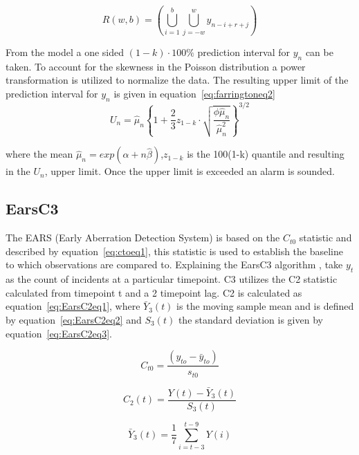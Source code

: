 \begin{equation} 
R(w,b)=(\bigcup_{i=1}^{b}\bigcup_{j=-w}^{w} y_{n-i+r+j})
\label{eq:farringtoneq1}  \end{equation} 

From the model a one sided $(1-k)\cdot 100\%$ prediction interval for $y_{n}$ can be taken. To account for the skewness in the Poisson distribution a power transformation is utilized to normalize the data. The resulting upper limit of the prediction interval for $y_{n}$ is given in equation~\ref{eq:farringtoneq2}
\begin{equation} 
U_{n}=\hat{\mu}_{n}\!\left \{ 1+\frac{2}{3}z_{1-k}\cdot\sqrt{ \frac{{\phi}\hat{\mu}_{n}}{\hat{\mu}^{2}_n}}  \right\}^{3/2}
\label{eq:farringtoneq2}  \end{equation}

where the mean $\hat{\mu}_{n}=exp(\!\hat{\alpha}+n\hat{\beta})$,$z_{1-k}$ is the 100(1-k) quantile and resulting in the $U_{n}$, upper limit. Once the upper limit is exceeded an alarm is sounded.


\subsection{EarsC3}

The EARS (Early Aberration Detection System) is based on the $C_{t0}$ statistic and described by equation~\ref{eq:ctoeq1}, this statistic is used to establish the baseline to which observations are compared to. Explaining the EarsC3 algorithm \citep{stacey2007comparison}, take $y_{t}$ as the count of incidents at a particular timepoint. C3 utilizes the C2 statistic calculated from timepoint t and a 2 timepoint lag. C2 is calculated as equation~\ref{eq:EarsC2eq1}, where $\bar{Y}_{3}(t)$  is the moving sample mean and is defined by equation~\ref{eq:EarsC2eq2} and $S_{3}(t)$ the standard deviation is given by equation~\ref{eq:EarsC2eq3}.

\begin{equation} 
C_{t0}=\frac{(y_{to}-\bar{y}_{to})}{s_{t0}}
\label{eq:ctoeq1}  \end{equation}

\begin{equation} 
C_{2}(t)=\frac{Y(t)-\bar{Y}_{3}(t)}{S_{3}(t)}
\label{eq:EarsC2eq1}  \end{equation}

\begin{equation} 
\bar{Y}_{3}(t)=\frac{1}{7}\sum_{i=t-3}^{t-9}Y(i)
\label{eq:EarsC2eq2}  \end{equation}

